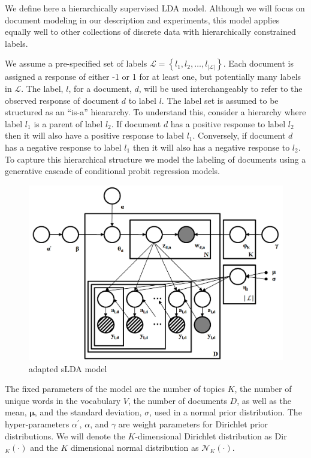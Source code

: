 
\label{sec:model} We define here a hierarchically supervised LDA
model. Although we will focus on document modeling in our description
and experiments, this model applies equally well to other collections
of discrete data with hierarchically constrained labels. 

We assume a pre-specified set of labels $\mathcal{L}=\left\{ l_{1},l_{2},\ldots,l_{\left|\mathcal{L}\right|}\right\} $.
Each document is assigned a response of either -1 or 1 for at least
one, but potentially many labels in $\mathcal{L}$. The label, $l$,
for a document, $d$, will be used interchangeably to refer to the
observed response of document $d$ to label $l$. The label set is
assumed to be structured as an {}``is-a'' hieararchy.
To understand this, consider a hierarchy where label $l_{1}$ is a
parent of label $l_{2}$. If document $d$ has a positive response
to label $l_{2}$ then it will also have a positive response to label
$l_{1}$. Conversely, if document $d$ has a negative response to
label $l_{1}$ then it will also has a negative response to $l_{2}$.
To capture this hierarchical structure we model the labeling of documents
using a generative cascade of conditional probit regression models.

%
\begin{figure}[h]
 \centering \includegraphics[scale=0.3]{Graphical_Model2} \caption{adapted sLDA model}


\label{fig:example} 
\end{figure}


The fixed parameters of the model are the number of topics $K$, the
number of unique words in the vocabulary $V$, the number of documents
$D$, as well as the mean, $\boldsymbol\mu$, and the standard deviation, $\sigma$,
used in a normal prior distribution. The hyper-parameters $\alpha^{\prime}$,
$\alpha$, and $\gamma$ are weight parameters for Dirichlet prior
distributions. We will denote the $K$-dimensional Dirichlet distribution
as Dir$_{K}(\cdot)$ and the $K$ dimensional normal distribution
as $\mathcal{N}_{K}(\cdot)$.

